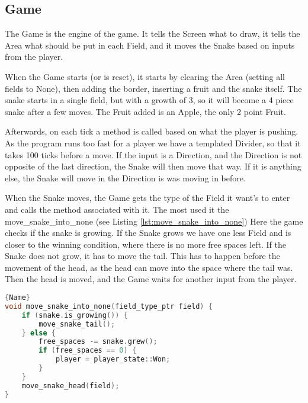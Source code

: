 \subsection{Game}

The Game is the engine of the game. It tells the Screen what to draw, it tells the Area what should be put in each Field, and it moves the Snake based on inputs from the player.

When the Game starts (or is reset), it starts by clearing the Area (setting all fields to None), then adding the border, inserting a fruit and the snake itself. The snake starts in a single field, but with a growth of 3, so it will become a 4 piece snake after a few moves. The Fruit added is an Apple, the only 2 point Fruit.

Afterwards, on each tick a method is called based on what the player is pushing. As the program runs too fast for a player we have a templated Divider, so that it takes 100 ticks before a move. If the input is a Direction, and the Direction is not opposite of the last direction, the Snake will then move that way. If it is anything else, the Snake will move in the Direction is was moving in before.

When the Snake moves, the Game gets the type of the Field it want's to enter and calls the method associated with it. The most used it the move\_snake\_into\_none (see Listing \ref{lst:move_snake_into_none}) Here the game checks if the snake is growing. If the Snake grows we have one less Field and is closer to the winning condition, where there is no more free spaces left. If the Snake does not grow, it has to move the tail. This has to happen before the movement of the head, as the head can move into the space where the tail was. Then the head is moved, and the Game waits for another input from the player.

\begin{lstlisting}[caption={Drawing a snake turning right},label={lst:draw_snake},frame=tlrb, language=C++]{Name}
void move_snake_into_none(field_type_ptr field) {
    if (snake.is_growing()) {
        move_snake_tail();
    } else {
        free_spaces -= snake.grew();
        if (free_spaces == 0) {
            player = player_state::Won;
        }
    }
  	move_snake_head(field);
}
\end{lstlisting}
